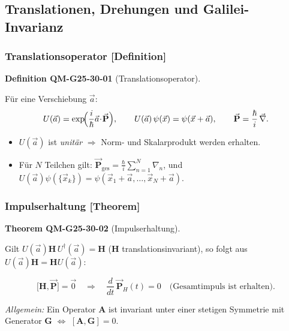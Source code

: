 \documentclass[10pt, letterpaper]{article}
\newcommand{\CustomHeading}[3]{%
  \par\medskip\noindent%
  \textbf{#1 #2} \textnormal{(#3)}.\enskip%
}
\newenvironment{DEF}[2]{\begin{unitbox}\CustomHeading{Definition}{#1}{#2}}{\end{unitbox}}
\newenvironment{THEO}[2]{\begin{unitbox}\CustomHeading{Theorem}{#1}{#2}}{\end{unitbox}}
\begin{document}










\subsection{Translationen, Drehungen und Galilei-Invarianz}

\subsubsection*{Translationsoperator [Definition]}

\begin{DEF}{QM-G25-30-01}{Translationsoperator}
Für eine Verschiebung $\vec a$:
\[
  U(\vec a)=\exp\!\Bigl(\frac{i}{\hbar}\vec a\!\cdot\!\vec{\mathbf P}\Bigr),
  \qquad
  U(\vec a)\,\psi(\vec x)=\psi(\vec x+\vec a),
  \qquad
  \vec{\mathbf P}=\frac{\hbar}{i}\,\vec\nabla .
\]

\begin{itemize}
  \item $U(\vec a)$ ist \emph{unitär} $\Rightarrow$ Norm- und Skalarprodukt werden erhalten.
  
  \item Für $N$ Teilchen gilt:  
  $\displaystyle
    \vec{\mathbf P}_{\text{ges}} = \frac{\hbar}{i} \sum_{n=1}^N \nabla_n$,  
  und
  $U(\vec a)\psi(\{\vec x_k\}) =
   \psi(\vec x_1+\vec a, \ldots, \vec x_N+\vec a)$.
\end{itemize}
\end{DEF}


\subsubsection*{Impulserhaltung [Theorem]}

\begin{THEO}{QM-G25-30-02}{Impulserhaltung}
Gilt
\(
  U(\vec a)\mathbf H\,U^\dagger(\vec a)=\mathbf H
\)
($\mathbf H$ translationsinvariant), so folgt aus
$U(\vec a)\mathbf H=\mathbf H U(\vec a)$:

\vspace{2pt}
\[
  \bigl[\mathbf H,\vec{\mathbf P}\bigr]=\vec 0
  \quad\Longrightarrow\quad
  \frac{d}{dt}\,\vec{\mathbf P}_H(t)=0
  \quad\text{(Gesamtimpuls ist erhalten).}
\]

\noindent
\emph{Allgemein:}  
Ein Operator $\mathbf A$ ist invariant unter einer stetigen
Symmetrie mit Generator $\mathbf G$
$\iff$\; $[\mathbf A,\mathbf G]=0$.
\end{THEO}
\end{document}
